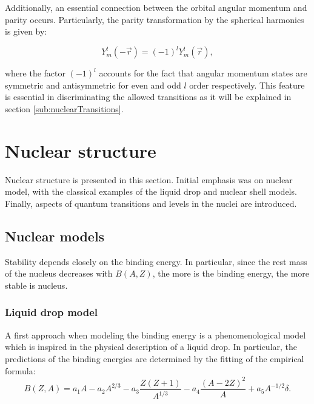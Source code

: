 \documentclass[openany]{book}
\begin{document}
Additionally, an essential connection between the orbital angular momentum and parity occurs. Particularly, the parity transformation by the spherical harmonics is given by:

\begin{equation} \label{eq:parity_sphericalHarmonics}
	Y^{l}_{m}(-\vec r) = (-1)^{l}Y^{l}_{m}(\vec r),
\end{equation}

where the factor $(-1)^{l}$ accounts for the fact that angular momentum states are symmetric and antisymmetric for even and odd $l$ order respectively. This feature is essential in discriminating the allowed transitions as it will be explained in section \ref{sub:nuclearTransitions}. 

\section{Nuclear structure} \label{sec:nuclearStructure}

Nuclear structure is presented in this section. Initial emphasis was  on nuclear model, with the classical examples of the liquid drop and nuclear shell models. Finally, aspects of quantum transitions and levels in the nuclei are introduced. 

\subsection{Nuclear models}  \label{sub:nuclearModels}

Stability depends closely on the binding energy. In particular, since the rest mass of the nucleus decreases with $B(A, Z)$, the more is the binding energy, the more stable is nucleus.

\subsubsection{Liquid drop model} \label{ssub:liquidDropModel}

A first approach when modeling the binding energy is a phenomenological model which is inspired in the physical description of a liquid drop. In particular, the predictions of the binding energies are determined by the fitting of the empirical formula: \\ 

\begin{equation} \label{eq:liquidDrop_bindingEnergy}
	B(Z,A )= a_1A - a_2A^{2/3} - a_3 \frac{Z(Z+1)}{A^{1/3}} - a_4 \frac{(A - 2Z)^2}{A}   +   a_5 A^{-1/2} \delta.
\end{equation}
\end{document}
